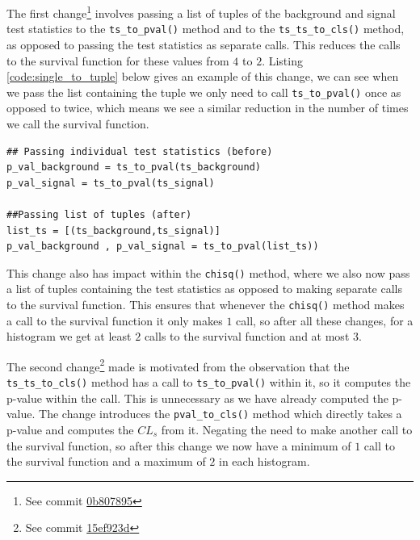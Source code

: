 The first change\footnote{See commit \href{https://gitlab.com/hepcedar/contur/-/commit/0b80789580cd0529bfdce28d2bae252755c45a63}{0b807895}} involves passing a list of tuples of the background and signal test statistics to the \texttt{ts\_to\_pval()} method and to the \texttt{ts\_ts\_to\_cls()} method, as opposed to passing the test statistics as separate calls. This reduces the calls to the survival function for these values from $4$ to $2$. Listing \ref{code:single_to_tuple} below gives an example of this change, we can see when we pass the list containing the tuple we only need to call \texttt{ts\_to\_pval()} once as opposed to twice, which means we see a similar reduction in the number of times we call the survival function.
\begin{code}
\label{code:single_to_tuple}
\begin{verbatim}
## Passing individual test statistics (before)
p_val_background = ts_to_pval(ts_background)
p_val_signal = ts_to_pval(ts_signal)

##Passing list of tuples (after)
list_ts = [(ts_background,ts_signal)]
p_val_background , p_val_signal = ts_to_pval(list_ts))

\end{verbatim}
\end{code}
This change also has impact within the \texttt{chisq()} method, where we also now pass a list of tuples containing the test statistics as opposed to making separate calls to the survival function. This ensures that whenever the \texttt{chisq()}  method makes a call to the survival function it only makes $1$ call, so after all these changes, for a histogram we get at least $2$ calls to the survival function and at most $3$.

The second change\footnote{See commit \href{https://gitlab.com/hepcedar/contur/-/commit/15ef923de401ced56f3186ed3bf6528c7d46f890}{15ef923d}} made is motivated from the observation that the \texttt{ts\_ts\_to\_cls()} method has a call to \texttt{ts\_to\_pval()} within it, so it computes the p-value within the call. This is unnecessary as we have already computed the p-value. The change introduces the \texttt{pval\_to\_cls()} method which directly takes a p-value and computes the $CL_s$ from it. Negating the need to make another call to the survival function, so after this change we now have a minimum of $1$ call to the survival function and a maximum of $2$ in each histogram.

